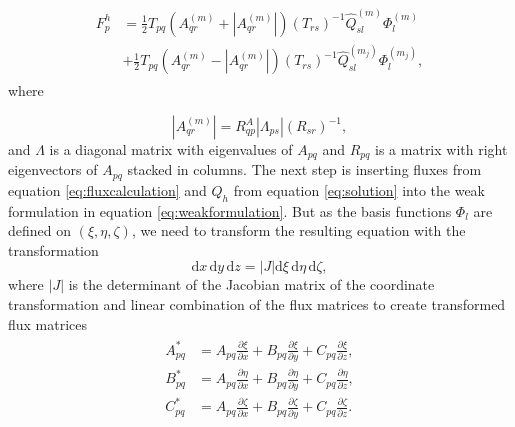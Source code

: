     \begin{align}
        \begin{split}
            F_p^h &= \frac{1}{2} T_{pq} \left(A_{qr}^{\left(m\right)} + \left|A_{qr}^{\left(m\right)}\right|\right)\left(T_{rs}\right)^{-1}
            \hat{Q}_{sl}^{\left(m\right)} \Phi_l^{\left(m\right)} \\
            &+ \frac{1}{2}T_{pq}\left(A_{qr}^{\left(m\right)} - \left|A_{qr}^{\left(m\right)}\right|\right)
            \left(T_{rs}\right)^{-1}\hat{Q}_{sl}^{\left(m_j\right)}\Phi_l^{\left(m_j\right)},            
        \end{split}
        \label{eq:fluxcalculation}
    \end{align}
where

\begin{equation}
\left|A_{qr}^{\left(m\right)}\right| = R_{qp}^A \left|\Lambda_{ps}\right| \left(R_{sr}\right)^{-1},
\end{equation}
and $\Lambda$ is a diagonal matrix with eigenvalues of $A_{pq}$ and $R_{pq}$ is a matrix with right eigenvectors of $A_{pq}$ stacked in columns.
The next step is inserting fluxes from equation \ref{eq:fluxcalculation} and $Q_h$ from equation \ref{eq:solution} into the weak
formulation in equation \ref{eq:weakformulation}. But as the basis functions $\Phi_l$ are defined on $\left(\xi, \eta, \zeta\right)$, we need
to transform the resulting equation with the transformation
\begin{equation}
    \text{d}x\, \text{d}y \, \text{d}z = \left|J\right| \text{d}\xi \,\text{d}\eta \,\text{d}\zeta,
\end{equation}
where $\left|J\right|$ is the determinant of the Jacobian matrix of the coordinate transformation and linear combination of the flux matrices to create transformed flux matrices
\begin{align}
    \begin{split}
        A_{pq}^{*} &= A_{pq} \frac{\partial \xi}{\partial x} + B_{pq} \frac{\partial \xi}{\partial y} + C_{pq} \frac{\partial \xi}{\partial z}, \\
        B_{pq}^{*} &= A_{pq} \frac{\partial \eta}{\partial x} + B_{pq} \frac{\partial \eta}{\partial y} + C_{pq} \frac{\partial \eta}{\partial z}, \\ 
        C_{pq}^{*} &= A_{pq} \frac{\partial \zeta}{\partial x} + B_{pq} \frac{\partial \zeta}{\partial y} + C_{pq} \frac{\partial \zeta}{\partial z}. 
    \end{split}
\end{align}

